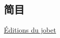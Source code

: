 \chapter*{\lecon}
\section*{简目}
\setcounter{tocdepth}{0}
\renewcommand{\contentsname}{}

\vspace{-2.5cm}
\tableofcontents

\vfill
\begin{center}
    \href{http://jacques-andre.fr/ed/}{Éditions du jobet}
\end{center}
\vfill